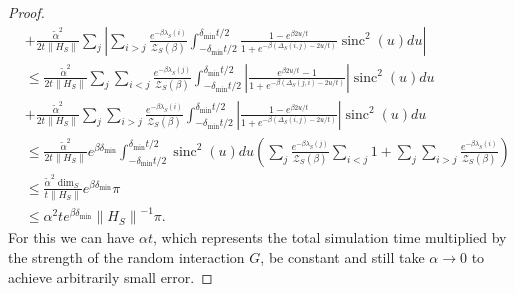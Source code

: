 \documentclass[
 amsmath,amssymb,
 aps,
onecolumn, 
nofootinbib]{revtex4-2}
\newcommand{\abs}[1]{\left| #1 \right|}
\newcommand{\norm}[1]{\left\| #1 \right\|}
\newcommand{\partfun}{\mathcal{Z}}
\DeclareMathOperator{\sinc}{sinc}
\begin{document}
\begin{proof}
\begin{align}
        &+ \frac{\widetilde{\alpha}^2}{2 t \norm{H_S}} \sum_j  \abs{\sum_{i > j} \frac{e^{-\beta \lambda_S(i)}}{\partfun_S(\beta)} \int_{-\delta_{\min} t /2 }^{\delta_{\min} t/ 2} \frac{1 - e^{\beta 2 u / t}}{1 + e^{-\beta(\Delta_S(i,j) - 2u/t)}} \sinc^2(u) du} \\
        &\le \frac{\widetilde{\alpha}^2}{2 t \norm{H_S}} \sum_j \sum_{i < j} \frac{e^{-\beta \lambda_S(j)}}{\partfun_S(\beta)} \int_{-\delta_{\min} t /2 }^{\delta_{\min} t/ 2}\abs{ \frac{ e^{\beta 2 u / t} - 1}{1 + e^{-\beta(\Delta_S(j, i) - 2u/t)}}} \sinc^2(u) du \nonumber \\
        &+ \frac{\widetilde{\alpha}^2}{2 t \norm{H_S}} \sum_j  \sum_{i > j} \frac{e^{-\beta \lambda_S(i)}}{\partfun_S(\beta)} \int_{-\delta_{\min} t /2 }^{\delta_{\min} t/ 2} \abs{ \frac{1 - e^{\beta 2 u / t}}{1 + e^{-\beta(\Delta_S(i,j) - 2u/t)}} } \sinc^2(u) du \\
        &\le \frac{\widetilde{\alpha}^2}{2 t \norm{H_S}} e^{\beta \delta_{\min}} \int_{-\delta_{\min}t/2}^{\delta_{\min}t /2} \sinc^2(u) du \left(\sum_j \frac{e^{-\beta \lambda_S(j)}}{\partfun_S(\beta)} \sum_{i < j} 1 + \sum_j \sum_{i > j} \frac{e^{-\beta \lambda_S(i)}}{\partfun_S(\beta)}  \right) \\
        &\le \frac{\widetilde{\alpha}^2 \dim_S}{t \norm{H_S}} e^{\beta \delta_{\min}} \pi \\
        &\le \alpha^2 t e^{\beta \delta_{\min}} \norm{H_S}^{-1} \pi.
    \end{align}
    For this we can have $\alpha t$, which represents the total simulation time multiplied by the strength of the random interaction $G$, be constant and still take $\alpha \to 0$ to achieve arbitrarily small error.


\end{proof}
\end{document}
